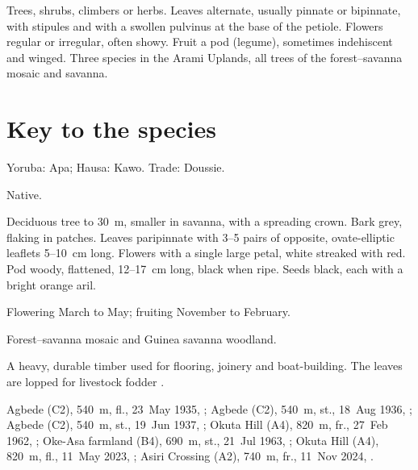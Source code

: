 \label{fam:fabaceae}

Trees, shrubs, climbers or herbs. Leaves alternate, usually pinnate or
bipinnate, with stipules and with a swollen pulvinus at the base of
the petiole. Flowers regular or irregular, often showy. Fruit a pod
(legume), sometimes indehiscent and winged. Three species in the Arami
Uplands, all trees of the forest--savanna mosaic and savanna.

\section*{Key to the species}
\begin{florakey}
\end{florakey}

\label{sp:FAB01}

 Yoruba: Apa; Hausa: Kawo. Trade:
Doussie.

 Native.

 Deciduous tree to 30~m, smaller in savanna, with a
spreading crown. Bark grey, flaking in patches. Leaves paripinnate
with 3--5 pairs of opposite, ovate-elliptic leaflets 5--10~cm long.
Flowers with a single large petal, white streaked with red. Pod woody,
flattened, 12--17~cm long, black when ripe. Seeds black, each with a
bright orange aril.

 Flowering March to May; fruiting November to
February.

 Forest--savanna mosaic and Guinea savanna woodland.

 A heavy, durable timber used for flooring, joinery and
boat-building. The leaves are lopped for livestock fodder
\citep{arbonnier2004,louppe2008}.

 Agbede (C2), 540~m, fl., 23~May 1935, ;
Agbede (C2), 540~m, st., 18~Aug 1936, ;
Agbede (C2), 540~m, st., 19~Jun 1937, ;
Okuta Hill (A4), 820~m, fr., 27~Feb 1962, ;
Oke-Asa farmland (B4), 690~m, st., 21~Jul 1963, ;
Okuta Hill (A4), 820~m, fl., 11~May 2023, ;
Asiri Crossing (A2), 740~m, fr., 11~Nov 2024, .

